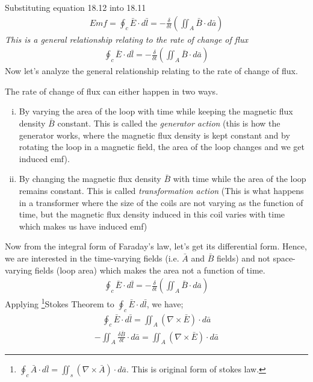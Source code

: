 Substituting equation 18.12 into 18.11 
\begin{align*}
\boxed{Emf = \oint_c\bar{E}\cdot d\bar{l} = -\frac{\delta}{\delta t} (\iint_A\bar{B}\cdot d\bar{a})}
\end{align*}
\emph{This is a general relationship relating to the rate of change of flux}	
\begin{align}
\boxed{\oint_c\bar{E}\cdot d\bar{l} = -\frac{\delta}{\delta t} (\iint_A\bar{B}\cdot d\bar{a})}
\end{align} 
Now let's analyze the general relationship relating to the rate of change of flux.

The rate of change of flux can either happen in two ways.
\begin{enumerate}[(i)]
\item By varying the area of the loop with time while keeping the magnetic flux density $\bar{B}$ constant. This is called the \emph{generator action} (this is how the generator works, where the magnetic flux density is kept constant and by rotating the loop in a magnetic field, the area of the loop changes and we get induced emf).
\item By changing the magnetic flux density $\bar{B}$ with time while the area of the loop remains constant. This is called \emph{transformation action} (This is what happens in a transformer where the size of the coils are not varying as the function of time, but the magnetic flux density induced in this coil varies with time which makes us have induced emf)
\end{enumerate}
Now from the integral form of Faraday's law, let's get its differential form. Hence, we are interested in the time-varying fields (i.e. $\bar{A}$ and $\bar{B}$ fields) and not space-varying fields (loop area) which makes the area not a function of time.
\begin{align*}
{\oint_c\bar{E}\cdot d\bar{l} = -\frac{\delta}{\delta t}(\iint_A\bar{B}\cdot d\bar{a})}
\end{align*}	
Applying \footnote[9]{$\oint_c\bar{A}\cdot d\bar{l} = \iint_s(\nabla \times \bar{A})\cdot d\bar{a}$. This is original form of stokes law.}Stokes Theorem to $\oint_c\bar{E}\cdot d\bar{l}$, we have;
\begin{align*}
\oint_c\bar{E}\cdot d\bar{l} = \iint_A(\nabla\times\bar{E})\cdot d\bar{a}
\end{align*}
\begin{align*}
-\iint_A\frac{\delta \bar{B}}{\delta t}\cdot d\bar{a} = \iint_A(\nabla\times\bar{E})\cdot d\bar{a}
\end{align*}
